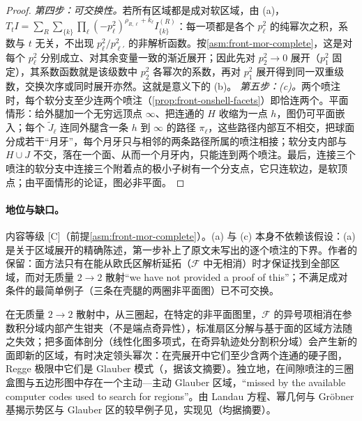 \begin{proof}
\emph{第四步：可交换性。}若所有区域都是成对软区域，由 (a)，$T_tI=\sum_R\sum_{\{k\}}\prod_\ell(-p_\ell^2)^{\rho_{R,\ell}+k_\ell}I^{(R)}_{\{k\}}$：每一项都是各个 $p_\ell^2$ 的纯幂次之积，系数与 $t$ 无关，不出现 $p_\ell^2/p_{\ell'}^2$ 的非解析函数。按\cref{asm:front-mor-complete}，这是对每个 $p_\ell^2$ 分别成立、对其余变量一致的渐近展开；因此先对 $p_2^2\to0$ 展开（$p_1^2$ 固定），其系数函数就是该级数中 $p_2^2$ 各幂次的系数，再对 $p_1^2$ 展开得到同一双重级数，交换次序或同时展开亦然。这就是\cite[式~(5.21)]{Gardi:2022khw}意义下的 (b)。
\emph{第五步：(c)。}两个喷注时，每个软分支至少连两个喷注（\cref{prop:front-onshell-facets}）即恰连两个。平面情形：给外腿加一个无穷远顶点 $\infty$、把连通的 $H$ 收缩为一点 $h$，图仍可平面嵌入；每个 $\tilde J_\ell$ 连同外腿含一条 $h$ 到 $\infty$ 的路径 $\pi_\ell$，这些路径内部互不相交，把球面分成若干“月牙”，每个月牙只与相邻的两条路径所属的喷注相接；软分支内部与 $H\cup J$ 不交，落在一个面、从而一个月牙内，只能连到两个喷注。最后，连接三个喷注的软分支中连接三个附着点的极小子树有一个分支点，它只连软边，是软顶点；由平面情形的论证，图必非平面。
\end{proof}

\paragraph{地位与缺口。}内容等级 [C]（前提\cref{asm:front-mor-complete}）。(a) 与 (c) 本身不依赖该假设：(a) 是关于区域展开的精确陈述，第一步补上了原文\cite[第~5.1~节]{Gardi:2022khw}未写出的逐个喷注的下界。作者的保留\cite[第~6~节]{Gardi:2022khw}：面方法只有在能从欧氏区解析延拓（$\mathcal F$ 中无相消）时才保证找到全部区域，而对无质量 $2\to2$ 散射“we have not provided a proof of this”；不满足成对条件的最简单例子（三条在壳腿的两圈非平面图）已不可交换\cite[第~5.3~节]{Gardi:2022khw}。

\begin{proposition}[“区域 $=$ Newton 多面体的下表面”在 Minkowski 运动学中不成立 \tagV]\label{prop:front-hidden-regions}
在无质量 $2\to2$ 散射中，从三圈起，在特定的非平面图里，$\mathcal F$ 的异号项相消在参数积分域内部产生钳夹（不是端点奇异性），标准扇区分解与基于面的区域方法随之失效；把多面体剖分（线性化图多项式，在奇异轨迹处分割积分域）会产生新的面即新的区域，有时决定领头幂次：在壳展开中它们至少含两个连通的硬子图，Regge 极限中它们是 Glauber 模式（\cite{Gardi:2024axt}，据该文摘要）。独立地，在间隙喷注的三圈盒图与五边形图中存在一个主动—主动 Glauber 区域，“missed by the available computer codes used to search for regions”\cite{Becher:2024kmk}。由 Landau 方程、幂几何与 Gröbner 基揭示势区与 Glauber 区的较早例子见\cite{Ananthanarayan:2018tog}，实现见\cite{Heinrich:2021dbf}（均据摘要）。
\end{proposition}

